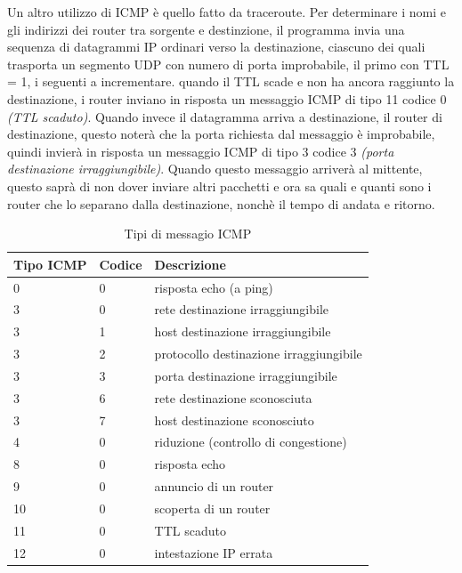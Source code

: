 \documentclass[11pt,a4paper]{book}
\begin{document}
Un altro utilizzo di ICMP è quello fatto da traceroute. Per determinare i nomi e gli indirizzi dei router tra sorgente e destinzione, il programma invia una sequenza di datagrammi IP ordinari verso la destinazione, ciascuno dei quali trasporta un  segmento UDP con numero di porta improbabile, il primo con TTL = 1, i seguenti a incrementare. quando il TTL scade e non ha ancora raggiunto la destinazione, i router inviano in risposta un messaggio ICMP di tipo 11 codice 0 \textit{(TTL scaduto)}. Quando invece il datagramma arriva a destinazione, il router di destinazione, questo noterà che la porta richiesta dal messaggio è improbabile, quindi invierà in risposta un messaggio ICMP di tipo 3 codice 3 \textit{(porta destinazione irraggiungibile)}. Quando questo messaggio arriverà al mittente, questo saprà di non dover inviare altri pacchetti e ora sa quali e quanti sono i router che lo separano dalla destinazione, nonchè il tempo di andata e ritorno.

\begin{table}[]
	\begin{tabular}{|l|l|l|}
		\hline
		\textbf{Tipo ICMP} & \textbf{Codice} & \textbf{Descrizione}                    \\ \hline
		0                  & 0               & risposta echo (a ping)                  \\ \hline
		3                  & 0               & rete destinazione irraggiungibile       \\ \hline
		3                  & 1               & host destinazione irraggiungibile       \\ \hline
		3                  & 2               & protocollo destinazione irraggiungibile \\ \hline
		3                  & 3               & porta destinazione irraggiungibile      \\ \hline
		3                  & 6               & rete destinazione sconosciuta           \\ \hline
		3                  & 7               & host destinazione sconosciuto           \\ \hline
		4                  & 0               & riduzione (controllo di congestione)    \\ \hline
		8                  & 0               & risposta echo                           \\ \hline
		9                  & 0               & annuncio di un router                   \\ \hline
		10                 & 0               & scoperta di un router                   \\ \hline
		11                 & 0               & TTL scaduto                             \\ \hline
		12                 & 0               & intestazione IP errata                  \\ \hline
	\end{tabular}
	\caption{Tipi di messagio ICMP}
	\label{tab: 001}
\end{table}
\pagebreak
\end{document}
